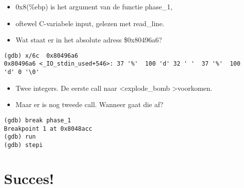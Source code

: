 \documentclass[12pt]{article}
\begin{document}
\begin{itemize}
\item 0x8(\%ebp) is het argument van de functie phase\_1,
\item oftewel C-variabele input, gelezen met read\_line.
\item Wat staat er in het absolute adress \$0x80496a6?
\end{itemize}

\begin{lstlisting}[language={[x86masm]Assembler}]
(gdb) x/6c  0x80496a6 
0x80496a6 <_IO_stdin_used+546>: 37 '%'  100 'd' 32 ' '  37 '%'  100 'd' 0 '\0'
\end{lstlisting}

\begin{itemize}
\item Twee integers. De eerste call naar \textless explode\_bomb \textgreater voorkomen. 
\item Maar er is nog tweede call. Wanneer gaat die af?
\end{itemize}

\begin{lstlisting}[language={[x86masm]Assembler}]
(gdb) break phase_1
Breakpoint 1 at 0x8048acc
(gdb) run
(gdb) stepi
\end{lstlisting}


\section*{Succes!}
\end{document}

